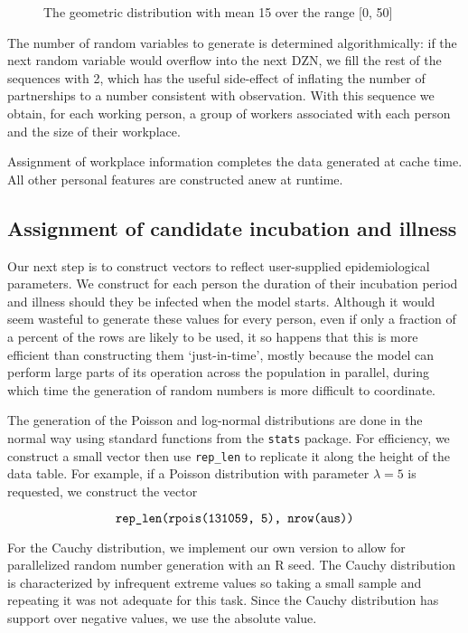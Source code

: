 \documentclass[a4paper,11pt]{scrreprt}
\newcommand*{\code}[1]{\texttt{#1}}
\begin{document}
\begin{figure}[!htbp]
\caption{The geometric distribution with mean 15 over the range [0, 50]}\label{fig:geom-distr}
\makebox[\textwidth]{
	
}
\end{figure}

The number of random variables to generate is determined algorithmically: if the next random variable
would overflow into the next DZN, we fill the rest of the sequences with 2, which has the useful 
side-effect of inflating the number of partnerships to a number consistent with observation.
With this sequence we obtain, for each working person, a group of workers associated with each person 
and the size of their workplace.

Assignment of workplace information completes the data generated at cache time. All other personal
features are constructed anew at runtime. 

\subsection{Assignment of candidate incubation and illness }

Our next step is to construct vectors to reflect user-supplied epidemiological parameters.
We construct for each person the duration of their incubation period and illness should they
be infected when the model starts. Although it would seem wasteful to generate these values
for every person, even if only a fraction of a percent of the rows are likely to be used, it 
so happens that this is more efficient than constructing them `just-in-time', mostly because
the model can perform large parts of its operation across the population in parallel, during 
which time the generation of random numbers is more difficult to coordinate.

The generation of the Poisson and log-normal distributions are done in the normal way using
 standard functions from the \code{stats} package.  For efficiency, we construct a small vector
 then use \code{rep\_len} to replicate it along the height of the data table. For example, if
 a Poisson distribution with parameter \(\lambda = 5\) is requested, we construct the vector

\[\text{\code{rep\_len(rpois(131059, 5), nrow(aus))}} \]

 For the Cauchy distribution, we implement our own version to allow for parallelized random
 number generation with an R seed. The Cauchy distribution is characterized by infrequent 
 extreme values so taking a small sample and repeating it was not adequate for this task.
 Since the Cauchy distribution has support over negative values,
 we use the absolute value.
\end{document}
